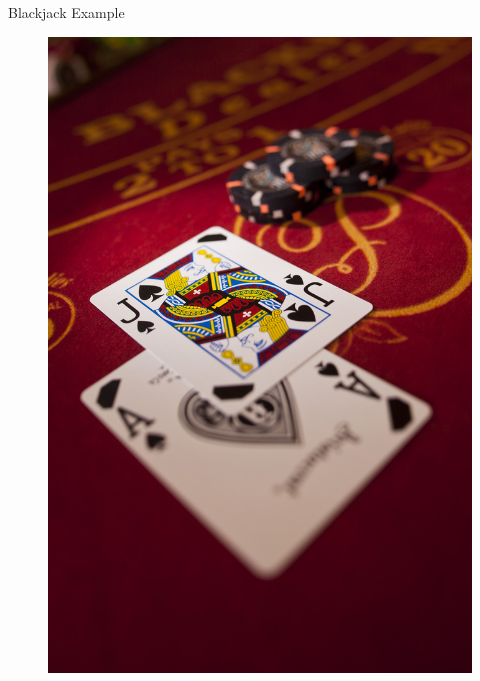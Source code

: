 \begin{frame}{Blackjack Example}
\begin{minipage}{0.25\textwidth}
\begin{figure}
\includegraphics[width=\textwidth]{img/blackjack.jpg}
\end{figure}
\end{minipage}

\end{frame}
\egroup